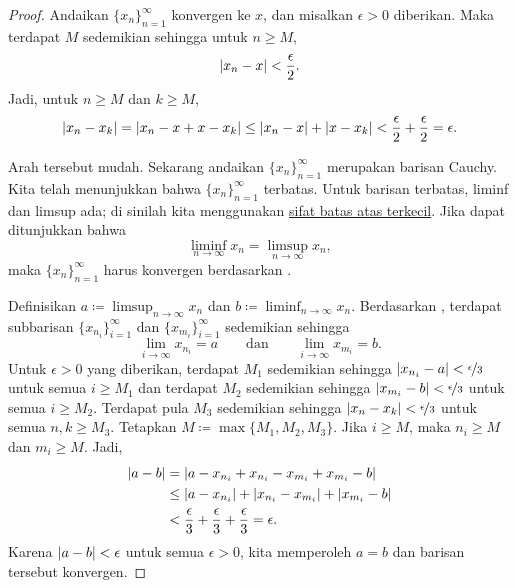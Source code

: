 \begin{proof}
Andaikan $\{ x_n \}_{n=1}^\infty$ konvergen ke $x$,
dan misalkan $\epsilon > 0$ diberikan.
Maka terdapat $M$ sedemikian sehingga untuk $n \geq M$,
\begin{equation*}
\lvert {x_n - x} \rvert < \frac{\epsilon}{2} .
\end{equation*}
Jadi, untuk $n \geq M$ dan $k \geq M$,
\begin{equation*}
\lvert {x_n - x_k} \rvert = 
\lvert {x_n - x + x - x_k} \rvert
\leq \lvert {x_n-x} \rvert + \lvert {x-x_k} \rvert < \frac{\epsilon}{2} + \frac{\epsilon}{2} =
\epsilon .
\end{equation*}

Arah tersebut mudah.  Sekarang andaikan $\{ x_n \}_{n=1}^\infty$ merupakan barisan Cauchy.
Kita telah menunjukkan bahwa $\{ x_n \}_{n=1}^\infty$ terbatas.
Untuk barisan terbatas, liminf dan limsup ada; di sinilah kita menggunakan
\hyperref[defn:lub]{sifat batas atas terkecil}.
Jika dapat ditunjukkan bahwa
\begin{equation*}
\liminf_{n\to \infty} x_n = \limsup_{n\to\infty} x_n ,
\end{equation*}
maka $\{ x_n \}_{n=1}^\infty$ harus konvergen berdasarkan .


Definisikan $a \coloneqq \limsup_{n\to\infty} x_n$ dan
$b \coloneqq \liminf_{n\to\infty} x_n$.
Berdasarkan , terdapat subbarisan
$\{ x_{n_i} \}_{i=1}^\infty$ dan
$\{ x_{m_i} \}_{i=1}^\infty$ sedemikian sehingga
\begin{equation*}
\lim_{i\to\infty} x_{n_i} = a
\qquad \text{dan} \qquad
\lim_{i\to\infty} x_{m_i} = b.
\end{equation*}
Untuk $\epsilon > 0$ yang diberikan,
terdapat $M_1$ sedemikian sehingga
$\lvert {x_{n_i} - a} \rvert < \nicefrac{\epsilon}{3}$ untuk semua $i \geq M_1$
dan terdapat $M_2$ sedemikian sehingga
$\lvert {x_{m_i} - b} \rvert < \nicefrac{\epsilon}{3}$ untuk semua $i \geq M_2$.
Terdapat pula $M_3$ sedemikian sehingga
$\lvert {x_n-x_k} \rvert < \nicefrac{\epsilon}{3}$
untuk semua $n,k \geq M_3$.
Tetapkan $M \coloneqq \max \{ M_1, M_2, M_3 \}$.
Jika $i \geq M$, maka $n_i \geq M$ dan $m_i \geq M$.  Jadi,
\begin{equation*}
\begin{split}
\lvert {a-b} \rvert & =
\lvert {a-x_{n_i}+x_{n_i}
-x_{m_i}+x_{m_i}
-b} \rvert \\
& \leq
\lvert {a-x_{n_i}} \rvert
+ \lvert {x_{n_i} -x_{m_i}} \rvert
+ \lvert {x_{m_i} -b} \rvert \\
& <
\frac{\epsilon}{3}
+
\frac{\epsilon}{3}
+
\frac{\epsilon}{3}
= \epsilon .
\end{split}
\end{equation*}
Karena $\lvert {a-b} \rvert < \epsilon$ untuk semua $\epsilon > 0$, kita memperoleh $a=b$ dan
barisan tersebut konvergen.
\end{proof}

